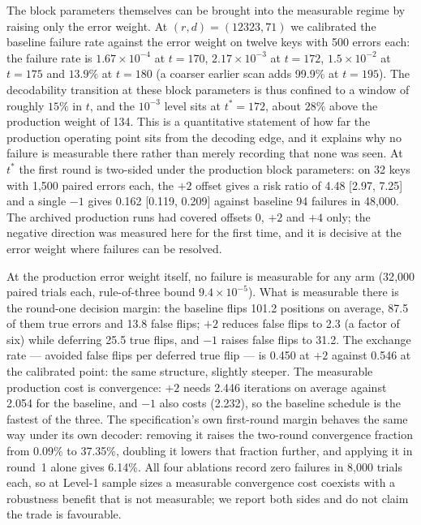 \documentclass[lettersize,journal]{IEEEtran}
\begin{document}
The block parameters themselves can be brought into the measurable regime by raising only the error weight. At $(r,d)=(12323,71)$ we calibrated the baseline failure rate against the error weight on twelve keys with 500 errors each: the failure rate is $1.67\times10^{-4}$ at $t=170$, $2.17\times10^{-3}$ at $t=172$, $1.5\times10^{-2}$ at $t=175$ and $13.9\%$ at $t=180$ (a coarser earlier scan adds 99.9\% at $t=195$). The decodability transition at these block parameters is thus confined to a window of roughly $15\%$ in $t$, and the $10^{-3}$ level sits at $t^{\ast}=172$, about $28\%$ above the production weight of 134. This is a quantitative statement of how far the production operating point sits from the decoding edge, and it explains why no failure is measurable there rather than merely recording that none was seen. At $t^{\ast}$ the first round is two-sided under the production block parameters: on 32 keys with 1{,}500 paired errors each, the $+2$ offset gives a risk ratio of 4.48 [2.97, 7.25] and a single $-1$ gives 0.162 [0.119, 0.209] against baseline 94 failures in 48{,}000. The archived production runs had covered offsets $0$, $+2$ and $+4$ only; the negative direction was measured here for the first time, and it is decisive at the error weight where failures can be resolved.

At the production error weight itself, no failure is measurable for any arm (32{,}000 paired trials each, rule-of-three bound $9.4\times10^{-5}$). What is measurable there is the round-one decision margin: the baseline flips 101.2 positions on average, 87.5 of them true errors and 13.8 false flips; $+2$ reduces false flips to 2.3 (a factor of six) while deferring 25.5 true flips, and $-1$ raises false flips to 31.2. The exchange rate --- avoided false flips per deferred true flip --- is 0.450 at $+2$ against 0.546 at the calibrated point: the same structure, slightly steeper. The measurable production cost is convergence: $+2$ needs 2.446 iterations on average against 2.054 for the baseline, and $-1$ also costs (2.232), so the baseline schedule is the fastest of the three. The specification's own first-round margin behaves the same way under its own decoder: removing it raises the two-round convergence fraction from 0.09\% to 37.35\%, doubling it lowers that fraction further, and applying it in round~1 alone gives 6.14\%. All four ablations record zero failures in 8{,}000 trials each, so at Level-1 sample sizes a measurable convergence cost coexists with a robustness benefit that is not measurable; we report both sides and do not claim the trade is favourable.
\end{document}
